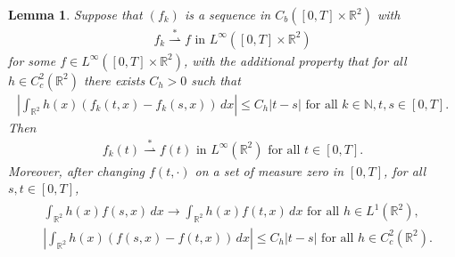 \documentclass[10pt,a4paper]{amsart}
\newtheorem{lemma}{Lemma}
\def\N{{\mathbb N}}
\def\R{{\mathbb R}}
\newcommand{\abs}[1]{\left\vert#1\right\vert}
\newcommand{\iny}{\ensuremath{\infty}}
\newcommand{\wstar}{\overset{*}{\rightharpoonup}}
\begin{document}
\begin{lemma}\label{L:WeakStarSectionalConvergence}
    Suppose that  $(f_k)$ is a sequence in $C_b([0, T] \times \R^2)$ with
    \begin{align*}
        f_k \wstar f \text{ in } L^\iny([0, T] \times \R^2)
    \end{align*}
    for some $f \in L^\iny([0, T] \times \R^2)$, with the additional property that for all $h \in C_c^2(\R^2)$ there exists $C_h > 0$ such that
    \begin{align*}
        \abs{\int_{\R^2} h(x) (f_k(t, x) - f_k(s, x)) \, dx}
            \le C_h \abs{t - s}
            \text{ for all } k \in \N, t, s \in [0, T].
    \end{align*}
    Then 
    \begin{align*}
        f_k(t) \wstar f(t)
            \text{ in } L^\iny(\R^2)
            \text{ for all } t \in [0, T].
    \end{align*}
        Moreover, after changing $f(t, \cdot)$ on a set of measure zero in $[0, T]$, for all $s, t \in [0, T]$,
    \begin{align}\label{e:WeakTimeContinuityOff}
        \begin{split}
            &\int_{\R^2} h(x) f(s, x) \, dx
                \to \int_{\R^2} h(x) f(t, x) \, dx
                \text{ for all } h \in L^1(\R^2), \\
            &\abs{\int_{\R^2} h(x) (f(s, x) - f(t, x)) \, dx}
                 \le C_h \abs{t - s}
                 \text{ for all } h \in C_c^2(\R^2).
            \end{split}
    \end{align}
\end{lemma}
\end{document}
